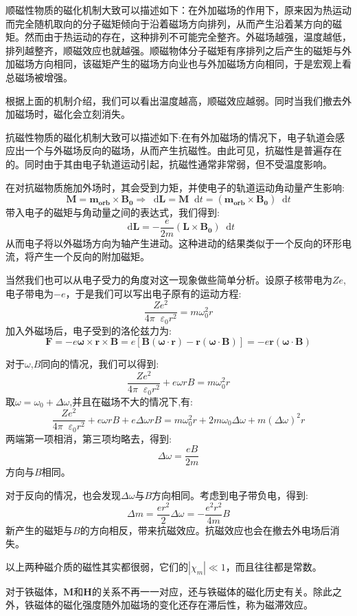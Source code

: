 \documentclass[12pt,a4paper,oneside]{report}
\theoremstyle{definition}
\theoremstyle{remark}
\newcommand{\mb}[1]{\mathbf{#1}}
\renewcommand{\d}{\mathop{}\!\mathrm{d}}
\renewcommand{\v}{\mathop{}\!\varepsilon}
\begin{document}
顺磁性物质的磁化机制大致可以描述如下：在外加磁场的作用下，原来因为热运动而完全随机取向的分子磁矩倾向于沿着磁场方向排列，从而产生沿着某方向的磁矩。然而由于热运动的存在，这种排列不可能完全整齐。外磁场越强，温度越低，排列越整齐，顺磁效应也就越强。顺磁物体分子磁矩有序排列之后产生的磁矩与外加磁场方向相同，该磁矩产生的磁场方向业也与外加磁场方向相同，于是宏观上看总磁场被增强。

根据上面的机制介绍，我们可以看出温度越高，顺磁效应越弱。同时当我们撤去外加磁场时，磁化会立刻消失。

抗磁性物质的磁化机制大致可以描述如下:在有外加磁场的情况下，电子轨道会感应出一个与外磁场反向的磁场，从而产生抗磁性。由此可见，抗磁性是普遍存在的。同时由于其由电子轨道运动引起，抗磁性通常非常弱，但不受温度影响。

在对抗磁物质施加外场时，其会受到力矩，并使电子的轨道运动角动量产生影响:
\[
\mathbf{M} = \mb{m_{orb}}\times \mathbf{B_0} \Rightarrow \d \mathbf{L} = \mathbf{M} \d t = (\mathbf{m_{orb}}\times \mb{B_0})\d t
\]
带入电子的磁矩与角动量之间的表达式，我们得到:
\[
\d \mathbf{L} = -\frac{e}{2m}(\mathbf{L}\times\mathbf{B_0}) \d t
\]
从而电子将以外磁场方向为轴产生进动。这种进动的结果类似于一个反向的环形电流，将产生一个反向的附加磁矩。

当然我们也可以从电子受力的角度对这一现象做些简单分析。设原子核带电为$Ze$,电子带电为$-e$，于是我们可以写出电子原有的运动方程:
\[
\frac{Ze^2}{4\pi\v_0r^2}=m\omega_0^2r
\]
加入外磁场后，电子受到的洛伦兹力为:
\[
\mathbf{F} = -e\bm{\omega}\times{\mathbf{r}}\times{\mb{B}} = e[\mb{B}(\bm{\omega}\cdot \mb{r})-\mb{r}(\bm{\omega}\cdot \mb{B})]=-e\mb{r}(\bm{\omega}\cdot \mb{B})
\]

对于$\omega$,$B$同向的情况，我们可以得到:
\[
\frac{Ze^2}{4\pi\v_0r^2}+e\omega rB=m\omega_0^2r
\]
取$\omega=\omega_0+\Delta \omega$,并且在磁场不大的情况下,有:
\[
\frac{Ze^2}{4\pi\v_0r^2}+e\omega rB +e\Delta \omega rB=m\omega_0^2r +2m\omega_0\Delta\omega+m(\Delta\omega)^2r
\]
两端第一项相消，第三项均略去，得到:
\[
\Delta \omega =\frac{eB}{2m}
\]
方向与$B$相同。

对于反向的情况，也会发现$\Delta \omega$与$B$方向相同。考虑到电子带负电，得到:
\[
\Delta m = \frac{er^2}{2}\Delta \omega =-\frac{e^2r^2}{4m}B
\]
新产生的磁矩与$B$的方向相反，带来抗磁效应。抗磁效应也会在撤去外电场后消失。

以上两种磁介质的磁性其实都很弱，它们的$|\chi_m|\ll 1$，而且往往都是常数。

对于铁磁体，$\mathbf{M}$和$\mathbf{H}$的关系不再一一对应，还与铁磁体的磁化历史有关。除此之外，铁磁体的磁化强度随外加磁场的变化还存在滞后性，称为磁滞效应。
\end{document}
